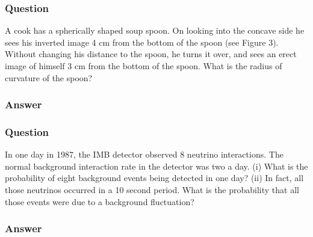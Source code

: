 \subsubsection{Question}
A cook has a spherically shaped soup spoon. On looking into the concave side he sees his inverted image 4 cm from the bottom of the spoon (see Figure 3). Without changing his distance to the spoon, he turns it over, and sees an erect image of himself 3 cm from the bottom of the spoon. What is the radius of curvature of the spoon?

\subsubsection{Answer}

\subsubsection{Question}
In one day in 1987, the IMB detector observed 8 neutrino interactions. The normal background interaction rate in the detector was two a day. (i) What is the probability of eight background events being detected in one day? (ii) In fact, all those neutrinos occurred in a 10 second period. What is the probability that all those events were due to a background fluctuation?
\subsubsection{Answer}

